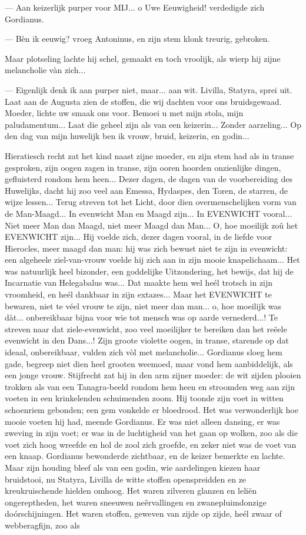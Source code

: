\documentclass[a4paper, 12pt, oneside, dutch]{article}
\begin{document}
--- Aan keizerlijk purper voor MIJ... o Uwe Eeuwigheid! verdedigde zich Gordianus.

--- Bèn ik eeuwig? vroeg Antoninus, en zijn stem klonk treurig, gebroken.

Maar plotseling lachte hij schel, gemaakt en toch vroolijk, als wierp hij zijne melancholie vàn zich...

--- Eigenlijk denk ik aan purper niet, maar... aan wit. Livilla, Statyra, sprei uit. Laat aan de Augusta zien de stoffen, die wij dachten voor ons bruidsgewaad. Moeder, lichte uw smaak ons voor. Bemoei u met mijn stola, mijn paludamentum... Laat die geheel zijn als van een keizerin... Zonder aarzeling... Op den dag van mijn huwelijk ben ik vrouw, bruid, keizerin, en godin...

Hieratiesch recht zat het kind naast zijne moeder, en zijn stem had als in transe gesproken, zijn oogen zagen in transe, zijn ooren hoorden onzienlijke dingen, gefluisterd rondom hem heen... Dezer dagen, de dagen van de voorbereiding des Huwelijks, dacht hij zoo veel aan Emessa, Hydaspes, den Toren, de starren, de wijze lessen... Terug streven tot het Licht, door dien overmenschelijken vorm van de Man-Maagd... In evenwicht Man en Maagd zijn... In EVENWICHT vooral... Niet meer Man dan Maagd, niet meer Maagd dan Man... O, hoe moeilijk zoû het EVENWICHT zijn... Hij voelde zich, dezer dagen vooral, in de liefde voor Hierocles, meer maagd dan man: hij was zich bewust niet te zijn in evenwicht: een algeheele ziel-van-vrouw voelde hij zich aan in zijn mooie knapelichaam... Het was natuurlijk heel bizonder, een goddelijke Uitzondering, het bewijs, dat hij de Incarnatie van Helegabalus was... Dat maakte hem wel heél trotsch in zijn vroomheid, en heél dankbaar in zijn extazes... Maar het EVENWICHT te bewaren, niet te véel vrouw te zijn, niet meer dan man... o, hoe moeilijk was dàt... onbereikbaar bijna voor wie tot mensch was op aarde vernederd...! Te streven naar dat ziele-evenwicht, zoo veel moeilijker te bereiken dan het reëele evenwicht in den Dans...! Zijn groote violette oogen, in transe, starende op dat ideaal, onbereikbaar, vulden zich vòl met melancholie... Gordianus sloeg hem gade, begreep niet dien heel grooten weemoed, maar vond hem aanbiddelijk, als een jonge vrouw. Stijfrecht zat hij in den arm zijner moeder: de wit zijden plooien trokken als van een Tanagra-beeld rondom hem heen en stroomden weg aan zijn voeten in een krinkelenden schuimenden zoom. Hij toonde zijn voet in witten schoenriem gebonden; een gem vonkelde er bloedrood. Het was verwonderlijk hoe mooie voeten hij had, meende Gordianus. Er was niet alleen dansing, er was zweving in zijn voet; er was in de luchtigheid van het gaan op wolken, zoo als die voet zich hoog wreefde en hol de zool zich groefde, en zeker niet was de voet van een knaap. Gordianus bewonderde zichtbaar, en de keizer bemerkte en lachte. Maar zijn houding bleef als van een godin, wie aardelingen kiezen haar bruidstooi, nu Statyra, Livilla de witte stoffen openspreidden en ze kreukruischende hielden omhoog. Het waren zilveren glanzen en leliën ongereptheden, het waren sneeuwen neêrvallingen en zwanepluimdonzige doórschijningen. Het waren stoffen, geweven van zijde op zijde, heél zwaar of webberagfijn, zoo als 
\end{document}
